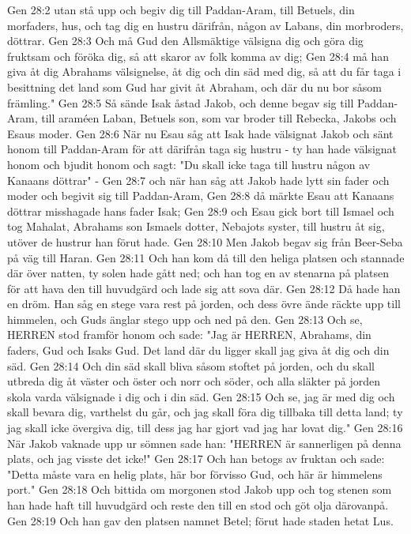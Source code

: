 Gen 28:2  utan stå upp och begiv dig till Paddan-Aram, till Betuels, din morfaders, hus, och tag dig en hustru därifrån, någon av Labans, din morbroders, döttrar.
Gen 28:3  Och må Gud den Allsmäktige välsigna dig och göra dig fruktsam och föröka dig, så att skaror av folk komma av dig;
Gen 28:4  må han giva åt dig Abrahams välsignelse, åt dig och din säd med dig, så att du får taga i besittning det land som Gud har givit åt Abraham, och där du nu bor såsom främling."
Gen 28:5  Så sände Isak åstad Jakob, och denne begav sig till Paddan-Aram, till araméen Laban, Betuels son, som var broder till Rebecka, Jakobs och Esaus moder.
Gen 28:6  När nu Esau såg att Isak hade välsignat Jakob och sänt honom till Paddan-Aram för att därifrån taga sig hustru - ty han hade välsignat honom och bjudit honom och sagt: "Du skall icke taga till hustru någon av Kanaans döttrar" -
Gen 28:7  och när han såg att Jakob hade lytt sin fader och moder och begivit sig till Paddan-Aram,
Gen 28:8  då märkte Esau att Kanaans döttrar misshagade hans fader Isak;
Gen 28:9  och Esau gick bort till Ismael och tog Mahalat, Abrahams son Ismaels dotter, Nebajots syster, till hustru åt sig, utöver de hustrur han förut hade.
Gen 28:10  Men Jakob begav sig från Beer-Seba på väg till Haran.
Gen 28:11  Och han kom då till den heliga platsen och stannade där över natten, ty solen hade gått ned; och han tog en av stenarna på platsen för att hava den till huvudgärd och lade sig att sova där.
Gen 28:12  Då hade han en dröm. Han såg en stege vara rest på jorden, och dess övre ände räckte upp till himmelen, och Guds änglar stego upp och ned på den.
Gen 28:13  Och se, HERREN stod framför honom och sade: "Jag är HERREN, Abrahams, din faders, Gud och Isaks Gud. Det land där du ligger skall jag giva åt dig och din säd.
Gen 28:14  Och din säd skall bliva såsom stoftet på jorden, och du skall utbreda dig åt väster och öster och norr och söder, och alla släkter på jorden skola varda välsignade i dig och i din säd.
Gen 28:15  Och se, jag är med dig och skall bevara dig, varthelst du går, och jag skall föra dig tillbaka till detta land; ty jag skall icke övergiva dig, till dess jag har gjort vad jag har lovat dig."
Gen 28:16  När Jakob vaknade upp ur sömnen sade han: "HERREN är sannerligen på denna plats, och jag visste det icke!"
Gen 28:17  Och han betogs av fruktan och sade: "Detta måste vara en helig plats, här bor förvisso Gud, och här är himmelens port."
Gen 28:18  Och bittida om morgonen stod Jakob upp och tog stenen som han hade haft till huvudgärd och reste den till en stod och göt olja därovanpå.
Gen 28:19  Och han gav den platsen namnet Betel; förut hade staden hetat Lus.
